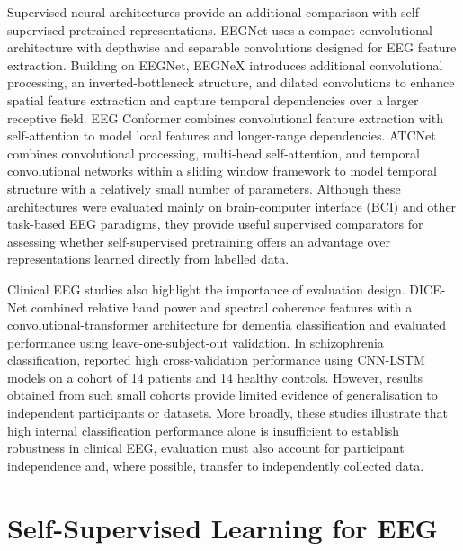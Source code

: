 Supervised neural architectures provide an additional comparison with self-supervised pretrained representations. EEGNet \parencite{lawhernEEGNetCompactConvolutional2018} uses a compact convolutional architecture with depthwise and separable convolutions designed for EEG feature extraction. Building on EEGNet, EEGNeX \parencite{chenReliableSignalsDecoding2024} introduces additional convolutional processing, an inverted-bottleneck structure, and dilated convolutions to enhance spatial feature extraction and capture temporal dependencies over a larger receptive field. EEG Conformer \parencite{songEEGConformerConvolutional2023a} combines convolutional feature extraction with self-attention to model local features and longer-range dependencies. ATCNet \parencite{altaheriPhysicsInformedAttentionTemporal2023} combines convolutional processing, multi-head self-attention, and temporal convolutional networks within a sliding window framework to model temporal structure with a relatively small number of parameters. Although these architectures were evaluated mainly on brain-computer interface (BCI) and other task-based EEG paradigms, they provide useful supervised comparators for assessing whether self-supervised pretraining offers an advantage over representations learned directly from labelled data.


Clinical EEG studies also highlight the importance of evaluation design. DICE-Net \parencite{miltiadousDICENetNovelConvolution2023} combined relative band power and spectral coherence features with a convolutional-transformer architecture for dementia classification and evaluated performance using leave-one-subject-out validation. In schizophrenia classification, \textcite{shoeibiAutomaticDiagnosisSchizophrenia2021} reported high cross-validation performance using CNN-LSTM models on a cohort of 14 patients and 14 healthy controls. However, results obtained from such small cohorts provide limited evidence of generalisation to independent participants or datasets. More broadly, these studies illustrate that high internal classification performance alone is insufficient to establish robustness in clinical EEG, evaluation must also account for participant independence and, where possible, transfer to independently collected data.


\section{Self-Supervised Learning for EEG}\label{sec:rel_ssl}

